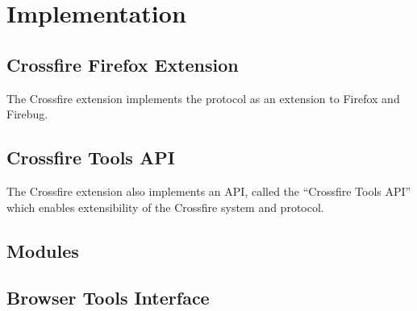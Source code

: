 \section{Implementation}
\subsection{Crossfire Firefox Extension}
The Crossfire extension implements the protocol as an extension to Firefox and
Firebug.
\subsection{Crossfire Tools API}
The Crossfire extension also implements an API, called the ``Crossfire Tools API''
which enables extensibility of the Crossfire system and protocol.
\subsection{Modules}

\subsection   {Browser Tools Interface}